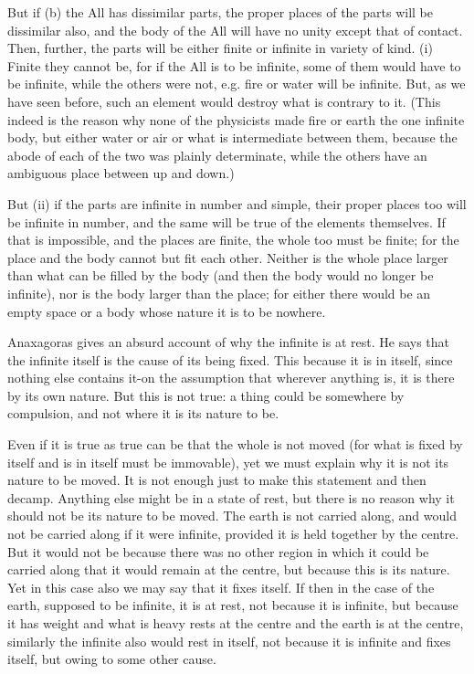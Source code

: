 But if (b) the All has dissimilar parts, the proper places of the
parts will be dissimilar also, and the body of the All will have no
unity except that of contact. Then, further, the parts will be either
finite or infinite in variety of kind. (i) Finite they cannot be,
for if the All is to be infinite, some of them would have to be infinite,
while the others were not, e.g. fire or water will be infinite. But,
as we have seen before, such an element would destroy what is contrary
to it. (This indeed is the reason why none of the physicists made
fire or earth the one infinite body, but either water or air or what
is intermediate between them, because the abode of each of the two
was plainly determinate, while the others have an ambiguous place
between up and down.) 

But (ii) if the parts are infinite in number and simple, their proper
places too will be infinite in number, and the same will be true of
the elements themselves. If that is impossible, and the places are
finite, the whole too must be finite; for the place and the body cannot
but fit each other. Neither is the whole place larger than what can
be filled by the body (and then the body would no longer be infinite),
nor is the body larger than the place; for either there would be an
empty space or a body whose nature it is to be nowhere. 

Anaxagoras gives an absurd account of why the infinite is at rest.
He says that the infinite itself is the cause of its being fixed.
This because it is in itself, since nothing else contains it-on the
assumption that wherever anything is, it is there by its own nature.
But this is not true: a thing could be somewhere by compulsion, and
not where it is its nature to be. 

Even if it is true as true can be that the whole is not moved (for
what is fixed by itself and is in itself must be immovable), yet we
must explain why it is not its nature to be moved. It is not enough
just to make this statement and then decamp. Anything else might be
in a state of rest, but there is no reason why it should not be its
nature to be moved. The earth is not carried along, and would not
be carried along if it were infinite, provided it is held together
by the centre. But it would not be because there was no other region
in which it could be carried along that it would remain at the centre,
but because this is its nature. Yet in this case also we may say that
it fixes itself. If then in the case of the earth, supposed to be
infinite, it is at rest, not because it is infinite, but because it
has weight and what is heavy rests at the centre and the earth is
at the centre, similarly the infinite also would rest in itself, not
because it is infinite and fixes itself, but owing to some other cause.

